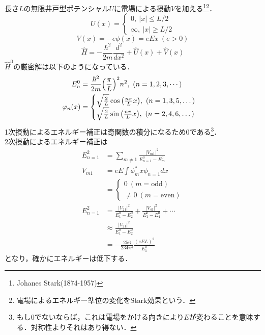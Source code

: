 \documentclass{standalone}
\begin{document}
  長さ$L$の無限井戸型ポテンシャル$U$に電場による摂動$V$を加える\footnote{
    Johanes Stark(1874-1957)
  }\footnote{
    電場によるエネルギー準位の変化をStark効果という．
  }．
  \begin{equation}
    U(x)=
    \begin{cases}
      0,\ \lvert x \rvert \le L/2\\
      \infty,\ \lvert x \rvert \ge L/2
    \end{cases}
  \end{equation}
  \begin{equation}
    V(x)=-e\phi(x)=eEx\ (e>0)
  \end{equation}
  \begin{equation}
    \hat{H}=-\frac{\hbar^2}{2m}\frac{d^2}{dx^2}+\hat{U}(x)+\hat{V}(x)
  \end{equation}
  $\hat{H}^0$の厳密解は以下のようになっている．
  \begin{align}
    E_n^0&=\frac{\hbar^2}{2m}\qty(\frac{\pi}{L})^2n^2,\ (n=1,2,3,\cdots)\\
    \phi_n(x)&=
    \begin{cases}
    \sqrt{\frac{2}{L}}\cos\qty(\frac{n\pi}{L}x),\ (n=1,3,5,\dots)\\
    \sqrt{\frac{2}{L}}\sin\qty(\frac{n\pi}{L}x),\ (n=2,4,6,\dots)
    \end{cases}
  \end{align}
  1次摂動によるエネルギー補正は奇関数の積分になるため0である\footnote{もし0でないならば，これは電場をかける向きにより$E$が変わることを意味する．対称性よりそれはあり得ない．}．\\
  2次摂動によるエネルギー補正は
  \begin{align}
    E_{n=1}^2&=\sum_{m\ne 1}\frac{\lvert V_{m1}\rvert^2}{E_{n=1}^0-E_m^0}\\
    V_{m1}&=eE\int\phi_m^{*}x\phi_{n=1}dx\\
    &=
    \begin{cases}
    0\ (m=\mathrm{odd})\\
    \ne 0\ (m=\mathrm{even})
    \end{cases}\\
    E_{n=1}^2&=\frac{\lvert V_{21}\rvert^2}{E_1^0-E_2^0}+\frac{\lvert V_{41}\rvert^2}{E_1^0-E_4^0}+\cdots\\
    &\approx\frac{\lvert V_{21}\rvert^2}{E_1^0-E_2^0}\\
    &=-\frac{256}{234\pi^4}\frac{(eEL)^2}{E_1^0}
  \end{align}
  となり，確かにエネルギーは低下する．
\end{document}
